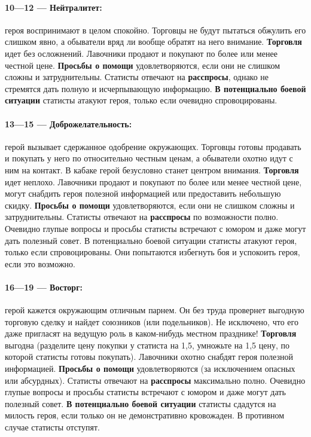 \paragraph{10—12 — Нейтралитет:} героя воспринимают в целом спокойно. Торговцы не будут пытаться обжулить его слишком явно, а обыватели вряд ли вообще обратят на него внимание.
\textbf{Торговля} идет без осложнений. Лавочники продают и покупают по более или менее честной цене.
\textbf{Просьбы о помощи} удовлетворяются, если они не слишком
сложны и затруднительны. Статисты отвечают на \textbf{расспросы}, однако не стремятся дать полную и исчерпывающую информацию. 
\textbf{В потенциально боевой ситуации} статисты атакуют героя, только если очевидно спровоцированы.
\paragraph{13—15 — Доброжелательность:} герой вызывает сдержанное одобрение окружающих. Торговцы готовы продавать и покупать у него по относительно честным ценам, а обыватели охотно идут с ним на контакт. В кабаке герой безусловно станет центром внимания.
\textbf{Торговля} идет неплохо. Лавочники продают и покупают по более или менее честной цене, могут снабдить героя полезной информацией или предоставить небольшую скидку.
\textbf{Просьбы о помощи} удовлетворяются, если они не слишком сложны и затруднительны. Статисты отвечают на \textbf{расспросы} по возможности полно. Очевидно глупые вопросы и просьбы статисты встречают с юмором и даже могут дать полезный совет. В потенциально боевой ситуации статисты атакуют героя, только если спровоцированы. Они попытаются избегнуть боя и успокоить героя, если это возможно.
\paragraph{16—19 — Восторг:} герой кажется окружающим отличным парнем. Он без труда провернет выгодную торговую сделку и найдет союзников (или подельников). Не исключено, что его даже пригласят на ведущую роль в каком-нибудь местном празднике!
\textbf{Торговля} выгодна (разделите цену покупки у статиста на 1,5, умножьте на 1,5 цену, по которой статисты готовы покупать). Лавочники охотно снабдят героя полезной информацией.
\textbf{Просьбы о помощи} удовлетворяются (за исключением опасных или абсурдных). Статисты отвечают на \textbf{расспросы} максимально полно. Очевидно глупые вопросы и просьбы статисты встречают с юмором и даже могут дать полезный совет.
\textbf{В потенциально боевой ситуации} статисты сдадутся на милость героя, если только он не демонстративно кровожаден. В противном случае статисты отступят.
